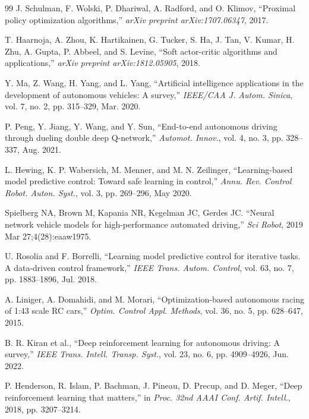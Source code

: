 \documentclass[journal]{IEEEtran}
\begin{document}
\begin{thebibliography}{99}
		J. Schulman, F. Wolski, P. Dhariwal, A. Radford, and O. Klimov, ``Proximal policy optimization algorithms,'' \textit{arXiv preprint arXiv:1707.06347}, 2017.
		
		T. Haarnoja, A. Zhou, K. Hartikainen, G. Tucker, S. Ha, J. Tan, V. Kumar, H. Zhu, A. Gupta, P. Abbeel, and S. Levine, ``Soft actor-critic algorithms and applications,'' \textit{arXiv preprint arXiv:1812.05905}, 2018.
		
		Y. Ma, Z. Wang, H. Yang, and L. Yang, ``Artificial intelligence applications in the development of autonomous vehicles: A survey,'' \textit{IEEE/CAA J. Autom. Sinica}, vol. 7, no. 2, pp. 315--329, Mar. 2020.
		
		P. Peng, Y. Jiang, Y. Wang, and Y. Sun, ``End-to-end autonomous driving through dueling double deep Q-network,'' \textit{Automot. Innov.}, vol. 4, no. 3, pp. 328--337, Aug. 2021.
		
		L. Hewing, K. P. Wabersich, M. Menner, and M. N. Zeilinger, ``Learning-based model predictive control: Toward safe learning in control,'' \textit{Annu. Rev. Control Robot. Auton. Syst.}, vol. 3, pp. 269--296, May 2020.
		
		Spielberg NA, Brown M, Kapania NR, Kegelman JC, Gerdes JC. ``Neural network vehicle models for high-performance automated driving,'' \textit{Sci Robot}, 2019 Mar 27;4(28):eaaw1975.
		
		U. Rosolia and F. Borrelli, ``Learning model predictive control for iterative tasks. A data-driven control framework,'' \textit{IEEE Trans. Autom. Control}, vol. 63, no. 7, pp. 1883--1896, Jul. 2018.
		
		A. Liniger, A. Domahidi, and M. Morari, ``Optimization-based autonomous racing of 1:43 scale RC cars,'' \textit{Optim. Control Appl. Methods}, vol. 36, no. 5, pp. 628--647, 2015.
		
		B. R. Kiran et al., ``Deep reinforcement learning for autonomous driving: A survey,'' \textit{IEEE Trans. Intell. Transp. Syst.}, vol. 23, no. 6, pp. 4909--4926, Jun. 2022.
		
		 P. Henderson, R. Islam, P. Bachman, J. Pineau, D. Precup, and D. Meger, ``Deep reinforcement learning that matters,'' in \textit{Proc. 32nd AAAI Conf. Artif. Intell.}, 2018, pp. 3207--3214.
		
	\end{thebibliography}
	
\end{document}
